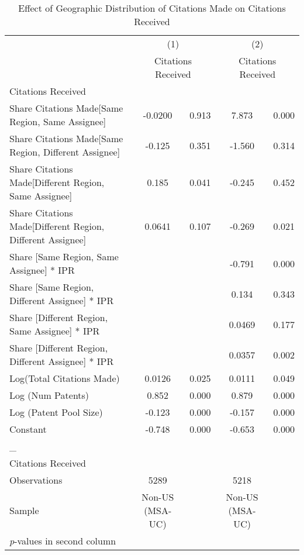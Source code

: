 {
\begin{longtable}{l*{2}{cc}}
\caption{Effect of Geographic Distribution of Citations Made on Citations Received \label{model24}}\\
\hline\hline\endfirsthead\hline\endhead\hline\endfoot\endlastfoot
                &\multicolumn{2}{c}{(1)}&\multicolumn{2}{c}{(2)}\\
                &\multicolumn{2}{c}{Citations Received}&\multicolumn{2}{c}{Citations Received}\\
\hline
Citations Received&         &         &         &         \\
Share Citations Made[Same Region, Same Assignee]&  -0.0200&    0.913&    7.873&    0.000\\
Share Citations Made[Same Region, Different Assignee]&   -0.125&    0.351&   -1.560&    0.314\\
Share Citations Made[Different Region, Same Assignee]&    0.185&    0.041&   -0.245&    0.452\\
Share Citations Made[Different Region, Different Assignee]&   0.0641&    0.107&   -0.269&    0.021\\
Share [Same Region, Same Assignee] * IPR&         &         &   -0.791&    0.000\\
Share [Same Region, Different Assignee] * IPR&         &         &    0.134&    0.343\\
Share [Different Region, Same Assignee] * IPR&         &         &   0.0469&    0.177\\
Share [Different Region, Different Assignee] * IPR&         &         &   0.0357&    0.002\\
Log(Total Citations Made)&   0.0126&    0.025&   0.0111&    0.049\\
Log (Num Patents)&    0.852&    0.000&    0.879&    0.000\\
Log (Patent Pool Size)&   -0.123&    0.000&   -0.157&    0.000\\
Constant        &   -0.748&    0.000&   -0.653&    0.000\\
\hline
\_               &         &         &         &         \\
Citations Received&         &         &         &         \\
\hline
Observations    &     5289&         &     5218&         \\
Sample          &Non-US (MSA-UC)&         &Non-US (MSA-UC)&         \\
\hline\hline
\multicolumn{5}{l}{\footnotesize \textit{p}-values in second column}\\
\end{longtable}
}
